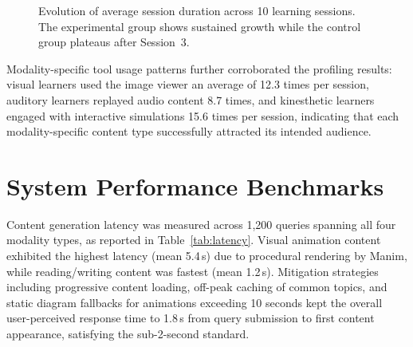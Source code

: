 \begin{figure}[htb]
	\centering
	\caption{Evolution of average session duration across 10 learning sessions. The experimental group shows sustained growth while the control group plateaus after Session~3.}
	\label{fig:session_dur}
\end{figure}

Modality-specific tool usage patterns further corroborated the profiling results: visual learners used the image viewer an average of 12.3 times per session, auditory learners replayed audio content 8.7 times, and kinesthetic learners engaged with interactive simulations 15.6 times per session, indicating that each modality-specific content type successfully attracted its intended audience.

\section{System Performance Benchmarks}

Content generation latency was measured across 1,200 queries spanning all four modality types, as reported in Table~\ref{tab:latency}. Visual animation content exhibited the highest latency (mean 5.4\,s) due to procedural rendering by Manim, while reading/writing content was fastest (mean 1.2\,s). Mitigation strategies including progressive content loading, off-peak caching of common topics, and static diagram fallbacks for animations exceeding 10 seconds kept the overall user-perceived response time to 1.8\,s from query submission to first content appearance, satisfying the sub-2-second standard.

